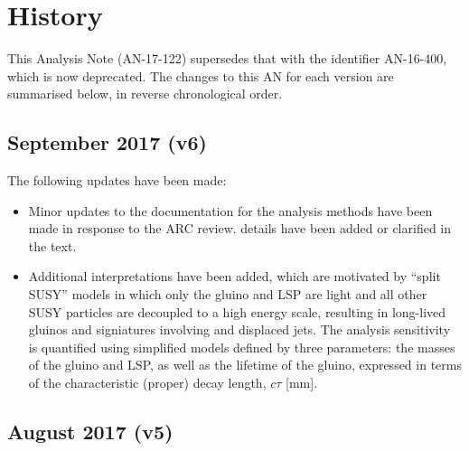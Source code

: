 
\section{History}
\label{sec:history}

This Analysis Note (AN-17-122) supersedes that with the identifier
AN-16-400, which is now deprecated. The changes to this AN for each
version are summarised below, in reverse chronological order.

\subsection{September 2017 (v6)}

The following updates have been made:
\begin{itemize}
\item Minor updates to the documentation for the analysis methods have
  been made in response to the ARC review. \eg details have been added
  or clarified in the text. 
\item Additional interpretations have been added, which are motivated
  by ``split SUSY'' models in which only the gluino and LSP are light
  and all other SUSY particles are decoupled to a high energy
  scale, resulting in long-lived gluinos and signiatures involving
  \ptmiss and displaced jets. The analysis sensitivity is quantified
  using simplified models defined by three parameters: the masses of
  the gluino and LSP, as well as the lifetime of the gluino, expressed
  in terms of the characteristic (proper) decay length, $c\tau$ [mm]. 
\end{itemize}

\subsection{August 2017 (v5)}

